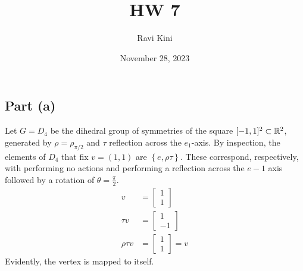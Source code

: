 \documentclass{article}
\title{HW 7}
\author{Ravi Kini}
\date{November 28, 2023}
\begin{document}
\maketitle

\subsection*{Part (a)}
Let $G = D_4$ be the dihedral group of symmetries of the square $[-1,1]^2 \subset \mathbb{R}^2$, generated by $\rho = \rho_{\pi/2}$ and $\tau$ reflection across the $e_1$-axis. By inspection, the elements of $D_4$ that fix $v = \left(1, 1\right)$ are $\left\{e, \rho\tau\right\}$. These correspond, respectively, with performing no actions and performing a reflection across the $e-1$ axis followed by a rotation of $\theta = \frac{\pi}{2}$.
\begin{equation}
    \begin{split}
        v & = \begin{bmatrix} 1 \\ 1 \end{bmatrix} \\
        \tau v & = \begin{bmatrix} 1 \\ -1 \end{bmatrix} \\
        \rho\tau v & = \begin{bmatrix} 1 \\ 1 \end{bmatrix} =  v
    \end{split}
\end{equation}
Evidently, the vertex is mapped to itself.
\end{document}
